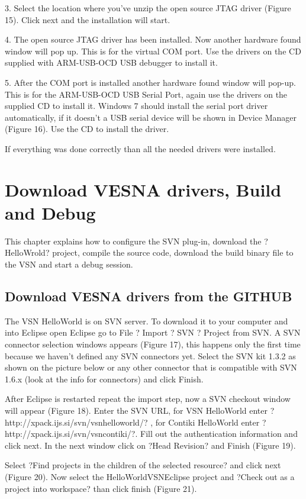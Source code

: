 \documentclass[12pt,a4paper]{article}
\begin{document}
3. Select the location where you've unzip the open source JTAG driver (Figure 15). Click next and the installation will start.

4. The open source JTAG driver has been installed. Now another hardware found window will pop up. This is for the virtual COM port. Use the drivers on the CD supplied with  ARM-USB-OCD USB debugger to install it.

5. After the COM port is installed another hardware found window will pop-up. This is for the ARM-USB-OCD USB Serial Port, again use the drivers on the supplied CD to install it. Windows 7 should install the serial port driver automatically, if it doesn't a USB serial device will be shown in Device Manager (Figure 16). Use the CD to install the driver.

If everything was done correctly than all the needed drivers were installed.

\section{Download VESNA drivers, Build and Debug}
This chapter explains how to configure the SVN plug-in, download the ?HelloWrold? project,  compile the source code, download the build binary file to the VSN and start a debug session. 

\subsection{Download  VESNA drivers from the GITHUB}
The VSN HelloWorld is on SVN server. To download it to your computer and into Eclipse open Eclipse go to File ? Import ? SVN ? Project from SVN. A SVN connector selection windows appears (Figure 17), this happens only the first time because we haven't defined any SVN connectors yet. Select the SVN kit 1.3.2 as shown on the picture below or any other connector that is compatible with SVN 1.6.x (look at the info for connectors) and click Finish.

After Eclipse is restarted repeat the import step, now a SVN checkout window will appear (Figure 18). Enter the SVN URL, for VSN HelloWorld enter ?http://xpack.ijs.si/svn/vsnhelloworld/? , for Contiki HelloWorld enter ?http://xpack.ijs.si/svn/vsncontiki/?. Fill out the authentication information and click next.
In the next window click on ?Head Revision? and Finish (Figure 19).

Select ?Find projects in the children of the selected resource? and click next (Figure 20).
Now select the HelloWorldVSNEclipse project and ?Check out as a project into workspace? than click finish (Figure 21).
\end{document}
